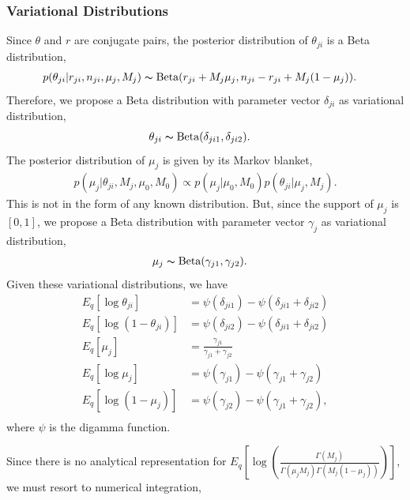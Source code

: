 \documentclass{bmcart}
\begin{document}
\subsubsection*{Variational Distributions}
Since $\theta$ and $r$ are conjugate pairs, the posterior distribution of $\theta_{ji}$ is a Beta distribution,
\begin{align}
&p(\theta_{ji}|r_{ji},n_{ji},\mu_j,M_j)
\thicksim \text{Beta}(r_{ji}+M_j \mu_j, n_{ji}-r_{ji}+M_j(1-\mu_j)).
\end{align}
Therefore, we propose a Beta distribution with parameter vector $\delta_{ji}$ as variational distribution,
\begin{align}
\theta_{ji} &\thicksim \text{Beta}(\delta_{ji1}, \delta_{ji2}) \nonumber.
\end{align}
%
The posterior distribution of $\mu_j$ is given by its Markov blanket,
\begin{align}
p(\mu_j|\theta_{ji},M_j,\mu_0,M_0)\propto p(\mu_j|\mu_0,M_0)p(\theta_{ji}|\mu_j,M_j).
\end{align}
This is not in the form of any known distribution.
But, since the support of $\mu_j$ is $[0,1]$, we propose a Beta distribution with parameter vector $\gamma_{j}$ as variational distribution,
\begin{align}
\mu_j &\thicksim \text{Beta}(\gamma_{j1}, \gamma_{j2}) \nonumber.
\end{align}
Given these variational distributions, we have
\begin{align}
E_q \left[ \log \theta_{ji} \right] &= \psi(\delta_{ji1}) - \psi(\delta_{ji1}+\delta_{ji2}) \nonumber \\
E_q \left[ \log \left( 1 - \theta_{ji}\right) \right]&= \psi(\delta_{ji2}) - \psi(\delta_{ji1}+\delta_{ji2}) \nonumber \\
E_q \left[ \mu_j \right] &= \frac{\gamma_{j1}}{\gamma_{j1} + \gamma_{j2}} \nonumber \\
E_q  \left[ \log \mu_j \right] &= \psi(\gamma_{j1}) - \psi(\gamma_{j1}+\gamma_{j2}) \nonumber \\
E_q  \left[ \log (1 - \mu_j)\right] &= \psi(\gamma_{j2}) - \psi(\gamma_{j1}+\gamma_{j2})\nonumber, \\
\end{align}
where $\psi$ is the digamma function.

Since there is no analytical representation for $ E_q\left[ \log \left( \frac{ \Gamma(M_j) } { \Gamma(\mu_j M_j) \Gamma(M_j (1-\mu_j)) }\right)\right] $, we must resort to numerical integration,
\end{document}
